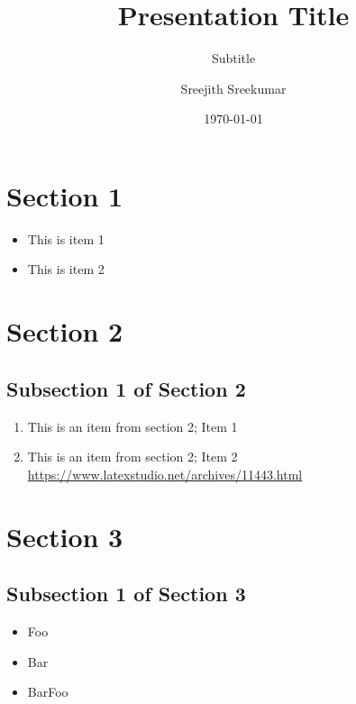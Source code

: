 \documentclass{beamer}
\author{Sreejith Sreekumar}
\title{Presentation Title}
\subtitle{Subtitle}
\institute{Digitas Inc.}
\date{\today}
\begin{document}
	
	\begin{frame}
		\titlepage
	\end{frame}
	\begin{frame}
		\tableofcontents[sectionstyle=show,subsectionstyle=show/shaded/hide,subsubsectionstyle=show/shaded/hide]
	\end{frame}
		
	
	\section{Section 1}
	
		\begin{frame}
			\begin{itemize}
				\item This is item 1
				\item This is item 2
			\end{itemize}
		\end{frame}
	
	\section{Section 2}
	    \subsection{Subsection 1 of Section 2}	
	    
		\begin{frame}
		  \begin{enumerate}
            \item This is an item from section 2; Item 1
            \item This is an item from section 2; Item 2
			\newline
			\url{https://www.latexstudio.net/archives/11443.html}
			\end{enumerate}	
		\end{frame}
	
	\section{Section 3}
	    \subsection{Subsection 1 of Section 3}
	
	\begin{frame}{}
		\begin{itemize}
			\item Foo
			\item Bar
			\item BarFoo
		\end{itemize}
	\end{frame}
\end{document}
